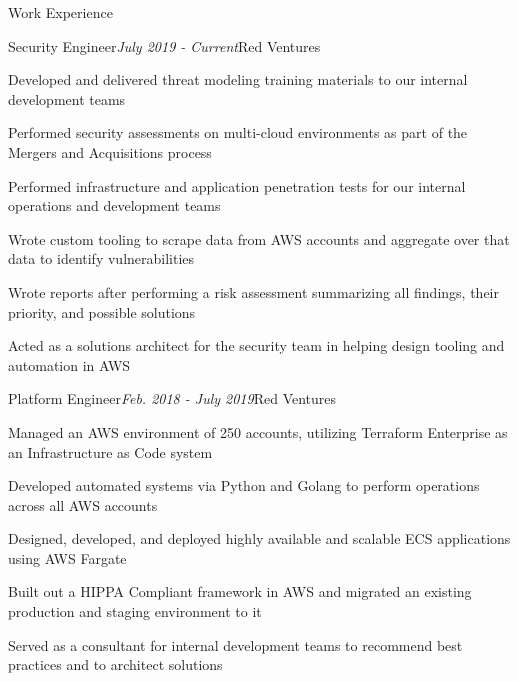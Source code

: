 \documentclass{resume} %
\begin{document}
\begin{rSection}{\vspace{-5pt}Work Experience}

  \begin{rSubsection}{Security Engineer}{\em July 2019 - Current}{Red Ventures}{}
  \item {Developed and delivered threat modeling training materials to our internal development teams}
  \item {Performed security assessments on multi-cloud environments as part of the Mergers and Acquisitions process}
  \item {Performed infrastructure and application penetration tests for our internal operations and development teams}
  \item {Wrote custom tooling to scrape data from AWS accounts and aggregate over that data to identify vulnerabilities}
  \item {Wrote reports after performing a risk assessment summarizing all findings, their priority, and possible solutions}
  \item {Acted as a solutions architect for the security team in helping design tooling and automation in AWS}

  \end{rSubsection}



\begin{rSubsection}{Platform Engineer}{\em Feb. 2018 - July 2019}{Red Ventures}{}
\item {Managed an AWS environment of 250 accounts, utilizing Terraform Enterprise as an Infrastructure as Code system}
\item {Developed automated systems via Python and Golang to perform operations across all AWS accounts}
\item {Designed, developed, and deployed highly available and scalable ECS applications using AWS Fargate}
\item {Built out a HIPPA Compliant framework in AWS and migrated an existing production and staging environment to it}
\item {Served as a consultant for internal development teams to recommend best practices and to architect solutions}

\end{rSubsection}



\end{rSection}
\end{document}

